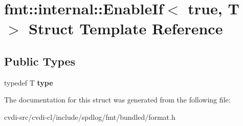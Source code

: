 \hypertarget{structfmt_1_1internal_1_1EnableIf_3_01true_00_01T_01_4}{}\section{fmt\+:\+:internal\+:\+:Enable\+If$<$ true, T $>$ Struct Template Reference}
\label{structfmt_1_1internal_1_1EnableIf_3_01true_00_01T_01_4}
\subsection*{Public Types}
\begin{DoxyCompactItemize}
\item 
typedef T {\bfseries type}\hypertarget{structfmt_1_1internal_1_1EnableIf_3_01true_00_01T_01_4_a98d04258f45ca191b0509ef570bcc826}{}\label{structfmt_1_1internal_1_1EnableIf_3_01true_00_01T_01_4_a98d04258f45ca191b0509ef570bcc826}

\end{DoxyCompactItemize}


The documentation for this struct was generated from the following file\+:\begin{DoxyCompactItemize}
\item 
cvdi-\/src/cvdi-\/cl/include/spdlog/fmt/bundled/format.\+h\end{DoxyCompactItemize}
